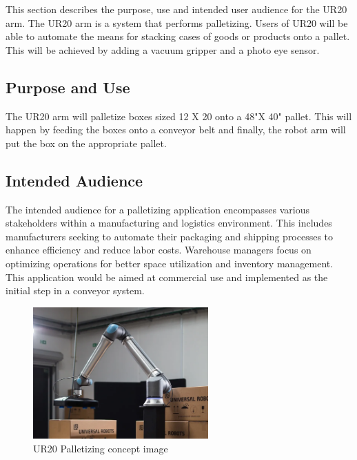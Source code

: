 This section describes the purpose, use and intended user audience for the UR20 arm. The UR20 arm is a system that performs palletizing. Users of UR20 will be able to automate the means for stacking cases of goods or products onto a pallet. This will be achieved by adding a vacuum gripper and a photo eye sensor.

\subsection{Purpose and Use}
The UR20 arm will palletize boxes sized 12 X 20 onto a 48"X 40" pallet. This will happen by feeding the boxes onto a conveyor belt and finally, the robot arm will put the box on the appropriate pallet.


\subsection{Intended Audience}
The intended audience for a palletizing application encompasses various stakeholders within a manufacturing and logistics environment. This includes manufacturers seeking to automate their packaging and shipping processes to enhance efficiency and reduce labor costs. Warehouse managers focus on optimizing operations for better space utilization and inventory management. This application would be aimed at commercial use and implemented as the initial step in a conveyor system.
\begin{figure}[h!]
	\centering
   	\includegraphics[width=0.60\textwidth]{images/UR20}
    \caption{UR20 Palletizing concept image}
\end{figure}